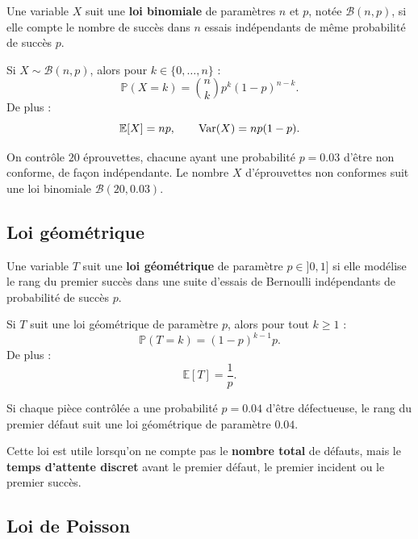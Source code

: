 \begin{Def}
Une variable $X$ suit une \textbf{loi binomiale} de paramètres $n$ et $p$, notée $\mathcal{B}(n,p)$, si elle compte le nombre de succès dans $n$ essais indépendants de même probabilité de succès $p$.
\end{Def}

\begin{Prop}
Si $X\sim \mathcal{B}(n,p)$, alors pour $k\in\{0,\dots,n\}$ :
$$
\mathbb{P}(X=k)=\binom{n}{k}p^k(1-p)^{n-k}.
$$
De plus :
$$
\mathbb{E}[X]=np, \qquad \operatorname{Var}(X)=np(1-p).
$$
\end{Prop}

\begin{Ex}
On contrôle $20$ éprouvettes, chacune ayant une probabilité $p=0.03$ d'être non conforme, de façon indépendante. Le nombre $X$ d'éprouvettes non conformes suit une loi binomiale $\mathcal{B}(20,0.03)$.
\end{Ex}

\subsection{Loi géométrique}

\begin{Def}
Une variable $T$ suit une \textbf{loi géométrique} de paramètre $p \in ]0,1]$ si elle modélise le rang du premier succès dans une suite d'essais de Bernoulli indépendants de probabilité de succès $p$.
\end{Def}

\begin{Prop}
Si $T$ suit une loi géométrique de paramètre $p$, alors pour tout $k \geq 1$ :
$$
\mathbb{P}(T=k)=(1-p)^{k-1}p.
$$
De plus :
$$
\mathbb{E}[T]=\frac{1}{p}.
$$
\end{Prop}

\begin{Ex}
Si chaque pièce contrôlée a une probabilité $p=0.04$ d'être défectueuse, le rang du premier défaut suit une loi géométrique de paramètre $0.04$.
\end{Ex}

\begin{Rmq}
Cette loi est utile lorsqu'on ne compte pas le \textbf{nombre total} de défauts, mais le \textbf{temps d'attente discret} avant le premier défaut, le premier incident ou le premier succès.
\end{Rmq}

\subsection{Loi de Poisson}

